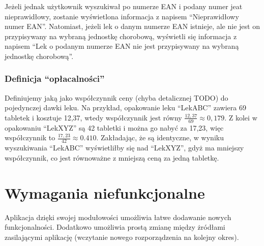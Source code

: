 \documentclass{article}
\begin{document}
      Jeżeli jednak użytkownik wyszukiwał po numerze EAN i podany numer jeat nieprawidłowy, zostanie wyświetlona informacja z napisem  ``Nieprawidłowy numer EAN''.
      Natomiast, jeżeli lek o danym numerze EAN istnieje, ale nie jest on przypisywany na wybraną jednostkę chorobową,
      wyświetli się informacja z napisem  ``Lek o podanym numerze EAN nie jest przypisywany na wybraną jednostkę chorobową''.

      \subsubsection{Definicja ``opłacalności''}
      Definiujemy jaką jako współczynnik ceny (chyba detalicznej TODO) do pojedynczej dawki leku.
      Na przykład, opakowanie leku ``LekABC'' zawiera 69 tabletek i kosztuje 12,37, wtedy współczynnik jest równy $\frac{12,37}{69} \approx 0,179$.
      Z kolei w opakowaniu ``LekXYZ'' są 42 tabletki i można go nabyć za 17,23, więc współczynnik to $\frac{17,23}{42} \approx 0.410$.
      Zakładając, że są identyczne, w wyniku wyszukiwania ``LekABC'' wyświetliłby się nad ``LekXYZ'', gdyż ma mniejszy współczynnik,
      co jest równoważne z mniejszą ceną za jedną tabletkę.

  \section{Wymagania niefunkcjonalne}

  Aplikacja dzięki swojej modułowości umożliwia łatwe dodawanie nowych funkcjonalności.
  Dodatkowo umożliwia prostą zmianę między żródłami zasilającymi aplikację (wczytanie nowego rozporządzenia na kolejny okres).
\end{document}
